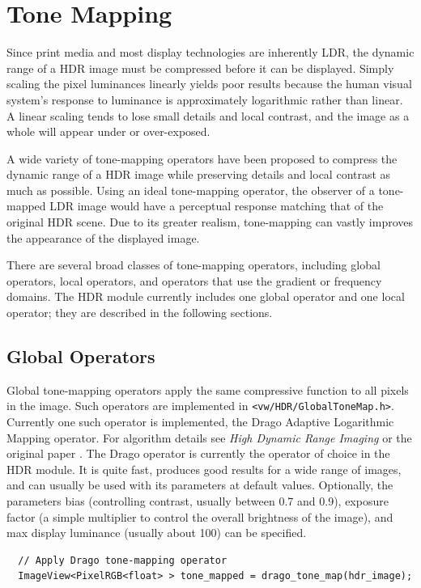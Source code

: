 \section{Tone Mapping}
\label{sec:tonemapping}
Since print media and most display technologies are inherently LDR,
the dynamic range of a HDR image must be compressed before it
can be displayed. Simply scaling the pixel luminances linearly
yields poor results because the human visual system's response to
luminance is approximately logarithmic rather than linear. A linear
scaling tends to lose small details and local contrast, and the
image as a whole will appear under or over-exposed.

A wide variety of tone-mapping operators have been proposed to
compress the dynamic range of a HDR image while preserving
details and local contrast as much as possible. Using an ideal
tone-mapping operator, the observer of a tone-mapped LDR image
would have a perceptual response matching that of the original
HDR scene. Due to its greater realism, tone-mapping can
vastly improves the appearance of the displayed image.

There are several broad classes of tone-mapping operators, including
global operators, local operators, and operators that use the
gradient or frequency domains. The HDR module currently includes
one global operator and one local operator; they are described in
the following sections.

\subsection{Global Operators}
Global tone-mapping operators apply the same compressive function to
all pixels in the image. Such operators are implemented in
\verb#<vw/HDR/GlobalToneMap.h>#. Currently one such operator is implemented, the
Drago Adaptive Logarithmic Mapping operator.  For algorithm details
see \emph{High Dynamic Range Imaging} \cite{hdrbook} or the original
paper \cite{drago}.  The Drago operator is currently the operator of
choice in the HDR module. It is quite fast, produces good results for
a wide range of images, and can usually be used with its parameters at
default values. Optionally, the parameters bias (controlling contrast,
usually between 0.7 and 0.9), exposure factor (a simple multiplier to
control the overall brightness of the image), and max display
luminance (usually about 100) can be specified.

\begin{verbatim}
  // Apply Drago tone-mapping operator 
  ImageView<PixelRGB<float> > tone_mapped = drago_tone_map(hdr_image);
\end{verbatim}

